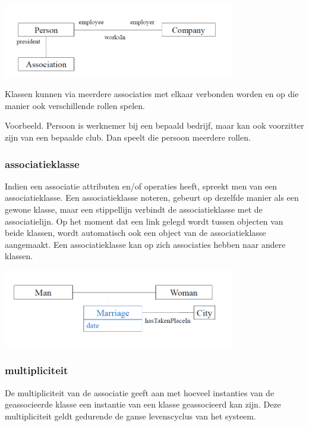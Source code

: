 
\begin{center}
\includegraphics[width=4in]{img/rol1}%
\end{center}

Klassen kunnen via meerdere associaties met elkaar verbonden worden en op die manier ook verschillende rollen spelen.

Voorbeeld. Persoon is werknemer bij een bepaald bedrijf, maar kan ook voorzitter zijn van een bepaalde club. Dan speelt die persoon meerdere rollen.

\subsubsection{associatieklasse}

Indien een associatie attributen en/of operaties heeft, spreekt men van een associatieklasse. Een associatieklasse noteren, gebeurt op dezelfde manier als een gewone klasse, maar een stippellijn verbindt de associatieklasse met de associatielijn. Op het moment dat een link gelegd wordt tussen objecten van beide klassen, wordt automatisch ook een object van de associatieklasse aangemaakt.
Een associatieklasse kan op zich associaties hebben naar andere klassen.


\begin{center}
\includegraphics[width=4in]{img/asscl1}%
\end{center}

\subsubsection{multipliciteit}

De multipliciteit van de associatie geeft aan met hoeveel instanties van de geassocieerde klasse een instantie van een klasse geassocieerd kan zijn. Deze multipliciteit geldt gedurende de ganse levenscyclus van het systeem.

